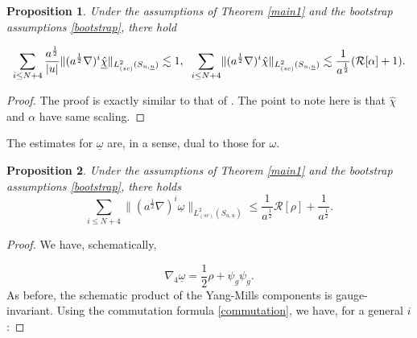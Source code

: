 \documentclass{amsart}
\newtheorem{proposition}{Proposition}[section]
\newcommand{\aln}{(\al \nabla)^i}
\newcommand{\omegabar}{\underline{\omega}}
\newcommand{\chihat}{\hat{\chi}}
\newcommand{\al}{a^{\frac{1}{2}}}
\newcommand{\chibarhat}{\underline{\hat{\chi}}}
\newcommand{\ubar}{\underline{u}}
\newcommand{\scaletwoSu}[1]{\lVert{#1} \rVert_{L^2_{(sc)}(S_{u,\ubar})}}
\begin{document}
{\begin{proposition}\label{chihats}
Under the assumptions of Theorem \ref{main1} and the bootstrap assumptions \eqref{bootstrap}, there hold

\[ \sum_{i\leq N+4} \frac{a^{\frac{1}{2}}}{\lvert u \rvert}\scaletwoSu{\aln \chibarhat} \lesssim 1, \hspace{2mm} \sum_{i\leq N+4}\scaletwoSu{\aln\chihat} \lesssim \frac{1}{a^{\frac{1}{2}}}(\mathcal{R}[\alpha]+1).\]
\end{proposition}

\begin{proof}
The proof is exactly similar to that of \cite{NMY1}. The point to note here is that $\chihat$ and $\alpha$ have same scaling.
\end{proof}
\noindent The estimates for $\omegabar$ are, in a sense, dual to those for $\omega$.
\begin{proposition}
Under the assumptions of Theorem \ref{main1} and the bootstrap assumptions \eqref{bootstrap}, there holds
\[ \sum_{i\leq N+4}\scaletwoSu{\aln \omegabar}\leq  \frac{1}{a^{\frac{1}{2}}} \mathcal{R}[\rho]+\frac{1}{a^{\frac{1}{2}}}.\]
\end{proposition}


\begin{proof}
We have, schematically, 

\[ \nabla_4 \omegabar = \frac{1}{2}\rho + \psi_g \psi_g.\] As before, the schematic product of the Yang-Mills components is gauge-invariant. Using the commutation formula \ref{commutation}, we have, for a general $i$:


\end{proof}}
\end{document}
